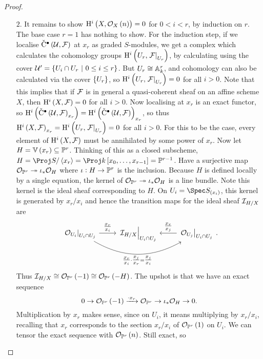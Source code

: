 \begin{proof}
\begin{itemize}
\item[$ 2 $.] It remains to show $ \H^i\br{X, \OOO_X\br{n}} = 0 $ for $ 0 < i < r $, by induction on $ r $. The base case $ r = 1 $ has nothing to show. For the induction step, if we localise $ \vC^\bullet\br{\UUU, \FFF} $ at $ x_r $ as graded $ S $-modules, we get a \Cech complex which calculates the cohomology groups $ \H^i\br{U_r, \eval{\FFF}_{U_r}} $, by calculating using the \Cech cover $ \UUU' = \cbr{U_i \cap U_r \st 0 \le i \le r} $. But $ U_r \cong \AA_k^r $, and \Cech cohomology can also be calculated via the cover $ \cbr{U_r} $, so $ \H^i\br{U_r, \eval{\FFF}_{U_r}} = 0 $ for all $ i > 0 $. Note that this implies that if $ \FFF $ is in general a quasi-coherent sheaf on an affine scheme $ X $, then $ \H^i\br{X, \FFF} = 0 $ for all $ i > 0 $. Now localising at $ x_r $ is an exact functor, so $ \H^i\br{\vC^\bullet\br{\UUU, \FFF}_{x_r}} = \H^i\br{\vC^\bullet\br{\UUU, \FFF}}_{x_r} $, so thus $ \H^i\br{X, \FFF}_{x_r} = \H^i\br{U_r, \eval{\FFF}_{U_r}} = 0 $ for all $ i > 0 $. For this to be the case, every element of $ \H^i\br{X, \FFF} $ must be annihilated by some power of $ x_r $. Now let $ H = \VV\br{x_r} \subseteq \PP^r $. Thinking of this as a closed subscheme, $ H = \Proj S / \abr{x_r} = \Proj k\sbr{x_0, \dots, x_{r - 1}} = \PP^{r - 1} $. Have a surjective map $ \OOO_{\PP^r} \twoheadrightarrow \iota_*\OOO_H $ where $ \iota : H \to \PP^r $ is the inclusion. Because $ H $ is defined locally by a single equation, the kernel of $ \OOO_{\PP^r} \twoheadrightarrow \iota_*\OOO_H $ is a line bundle. Note this kernel is the ideal sheaf corresponding to $ H $. On $ U_i = \Spec S_{\br{x_i}} $, this kernel is generated by $ x_r / x_i $ and hence the transition maps for the ideal sheaf $ \III_{H / X} $ are
$$
\begin{tikzcd}
\eval{\OOO_{U_i}}_{U_i \cap U_j} \arrow{r}{\tfrac{x_r}{x_i}} \arrow[bend right=30]{rr}[swap]{\tfrac{x_r}{x_i} \cdot \tfrac{x_j}{x_r} = \tfrac{x_j}{x_i}} & \eval{\III_{H / X}}_{U_i \cap U_j} & \eval{\OOO_{U_j}}_{U_i \cap U_j} \arrow{l}[swap]{\tfrac{x_r}{x_j}}
\end{tikzcd}.
$$
Thus $ \III_{H / X} \cong \OOO_{\PP^r}\br{-1} \cong \OOO_{\PP^r}\br{-H} $. The upshot is that we have an exact sequence
$$ 0 \to \OOO_{\PP^r}\br{-1} \xrightarrow{\cdot x_r} \OOO_{\PP^r} \to \iota_*\OOO_H \to 0. $$
Multiplication by $ x_r $ makes sense, since on $ U_i $, it means multiplying by $ x_r / x_i $, recalling that $ x_r $ corresponds to the section $ x_r / x_i $ of $ \OOO_{\PP^r}\br{1} $ on $ U_i $. We can tensor the exact sequence with $ \OOO_{\PP^r}\br{n} $. Still exact, so

\end{itemize}
\end{proof}
